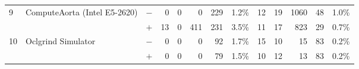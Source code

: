 \begin{tabular}{lll | rrrrr | rrrrr }
\hline
\multirow{ 2}{*}{9} & \multirow{ 2}{*}{ComputeAorta (Intel E5-2620)} & $-$ & 0 & 0 & 0 & 229 & 1.2\%       & 12 & 19 & 1060 & 48 & 1.0\% \\& & $+$ & 13 & 0 & 411 & 231 & 3.5\% & 11 & 17 & 823 & 29 & 0.7\% \\
\hline
\multirow{ 2}{*}{10} & \multirow{ 2}{*}{Oclgrind Simulator} & $-$ & 0 & 0 & 0 & 92 & 1.7\%       & 15 & 10 & 15 & 83 & 0.2\% \\& & $+$ & 0 & 0 & 0 & 79 & 1.5\% & 10 & 12 & 13 & 83 & 0.2\% \\
  \bottomrule
\end{tabular}

